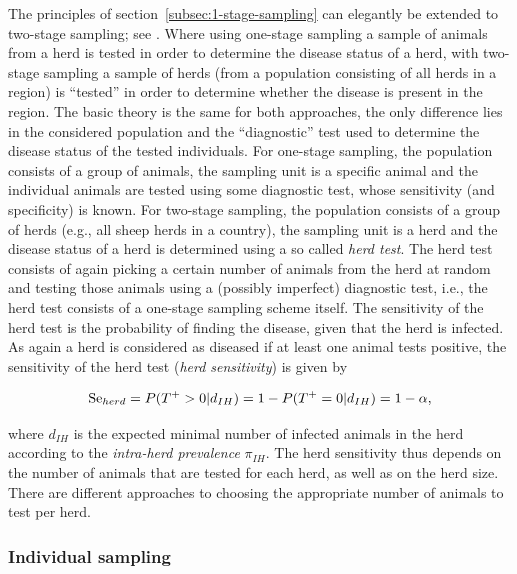 \documentclass[nojss]{jss}
\begin{document}
The principles of section~\ref{subsec:1-stage-sampling} can elegantly be extended to two-stage sampling; see \cite{CaBa98B}. Where using one-stage sampling a sample of animals from a herd is tested in order to determine the disease status of a herd, with two-stage sampling  a sample of herds (from a population consisting of all herds in a region) is ``tested'' in order to determine whether the disease is present in the region. The basic theory is the same for both approaches, the only difference lies in the considered population and the ``diagnostic'' test used to determine the disease status of the tested individuals. For one-stage sampling, the population consists of a group of animals, the sampling unit  is a specific animal and the individual animals are tested using some diagnostic test, whose sensitivity (and specificity) is known. For two-stage sampling, the population consists of a group of herds (e.g., all sheep herds in a country), the sampling unit is a herd and the disease status of a herd is determined using a so called  \emph{herd test}. The herd test consists of again picking a certain number of animals from the herd at random and testing those animals using a (possibly imperfect) diagnostic test, i.e., the herd test consists of a one-stage sampling scheme itself. The sensitivity of the herd test is the probability of finding the disease, given that the herd is infected. As again a herd is considered as diseased if at least one animal tests positive, the sensitivity of the herd test (\emph{herd sensitivity})   is given by

$$\mbox{Se}_{herd} = P(T^+>0|d_{IH}) = 1 - P(T^+ = 0|d_{IH}) = 1 - \alpha,$$

where $d_{IH}$ is the expected minimal number of infected animals in the herd according to the   \emph{intra-herd prevalence} $\pi_{IH}$. The herd sensitivity thus depends on the number of animals that are tested for each herd, as well as on the herd size. There are different approaches to choosing the appropriate number of animals to test per herd.



\subsubsection{Individual sampling}
\label{subsubsec:ind-sampling}
\end{document}
